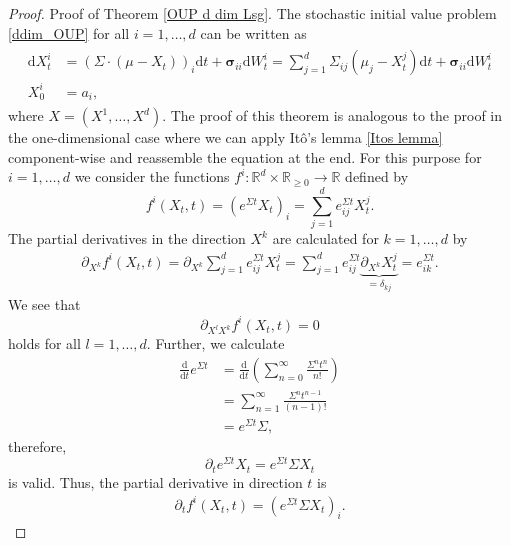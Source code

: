 \documentclass[11pt,titlepage]{article}
\newcommand{\R}{\mathbb{R}} %
\theoremstyle{definition}
\theoremstyle{remark}
\begin{document}
	\begin{proof}
		Proof of Theorem \ref{OUP d dim Lsg}. The stochastic initial value problem 
		\ref{ddim_OUP} for all $i=1,\ldots,d$ can be written as
		\begin{align}
			\begin{split}
				\mathrm{d}X_t^i &= (\Sigma\cdot (\mu-X_t))_i\mathrm{d}t +\boldsymbol{\sigma}_{ii} \mathrm{d}W_t^i
				=\sum_{j=1}^d \Sigma_{ij}(\mu_j-X_t^j)\mathrm{d}t+\boldsymbol{\sigma}_{ii} \mathrm{d}W_t^i\\
				X_0^i&=a_i, \label{ddim_OUP_komponentenweise}
			\end{split}
		\end{align}
		where $X = (X^1,\ldots,X^d)$. 
		The proof of this theorem is analogous to the proof in the one-dimensional case where we can apply Itô's lemma \ref{Itos lemma} component-wise and reassemble the equation at the end. 
		For this purpose for $i=1,\ldots,d$ we consider the functions 
		$f^i:\R^d\times \R_{\geq 0}\to\R$ defined by 
		\[f^i(X_t,t)=(e^{\Sigma t}X_t)_i = \sum_{j=1}^d e^{\Sigma t}_{ij}X_t^j.\]
		The partial derivatives in the direction $X^k$ are calculated for $k=1,\ldots,d$ by
		\begin{align}
			\partial_{X^k}f^i(X_t,t)=\partial_{X^k}\sum_{j=1}^d e^{\Sigma t}_{ij}X_t^j
			=\sum_{j=1}^d e^{\Sigma t}_{ij}\underbrace{\partial_{X^k}X_t^j}_{=\delta_{kj}}
			=e^{\Sigma t}_{ik}. \label{ito_part_abl1}
		\end{align}
		We see that
		\[\partial_{X^l X^k}f^i(X_t,t)=0\]
		holds for all $l=1,\ldots,d$. Further, we calculate
		\begin{align*}
			\frac{\mathrm{d}}{\mathrm{d}t} e^{\Sigma t} &= \frac{\mathrm{d}}{\mathrm{d}t} \left(\sum_{n=0}^{\infty} \frac{\Sigma^n t^n}{n!}\right) \\
			&= \sum_{n=1}^{\infty} \frac{\Sigma^n t^{n-1}}{(n-1)!} \\
			&= e^{\Sigma t}\Sigma,
		\end{align*}
		therefore, 
		\[\partial_t e^{\Sigma t}X_t = e^{\Sigma t}\Sigma X_t\]
		is valid. Thus, the partial derivative in direction $t$ is
		\begin{align}
			\partial_t f^i(X_t,t) = (e^{\Sigma t}\Sigma X_t)_i. \label{ito_part_abl2}
		\end{align}
		

\end{proof}
\end{document}
